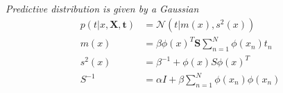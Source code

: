\documentclass[a4paper]{article}
\begin{document}
\emph{Predictive distribution is given by a Gaussian}
\begin{align*}
  p(t|x, \mathbf{X}, \mathbf{t}) &= \mathcal{N}(t|m(x), s^2(x))\\
  m(x) &= \beta \phi(x)^T \mathbf{S} \sum_{n=1}^N \phi(x_n)t_n\\
  s^2(x) &= \beta^{-1} + \phi(x) S \phi(x)^T\\
  S^{-1} &= \alpha I + \beta  \sum_{n=1}^N \phi(x_n)\phi(x_n)
\end{align*}
\end{document}
